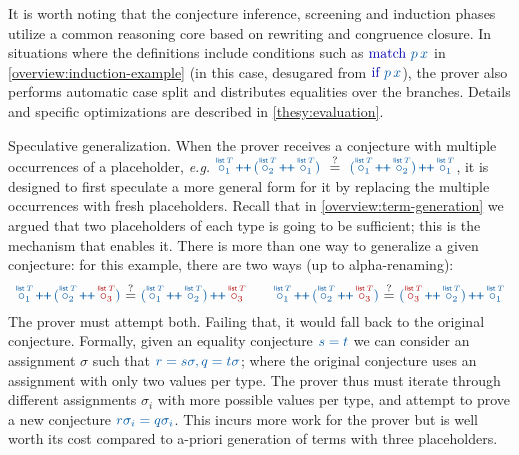 It is worth noting that the conjecture inference, screening and induction phases
utilize a common reasoning core based on rewriting and congruence closure.
In situations where the definitions include conditions such as
$\clrterm\tmatch~p\,x$ in \autoref{overview:induction-example} (in this case, desugared from $\clrterm\tif~p\,x$), the prover also performs automatic case split
and distributes equalities over the branches.
Details and specific optimizations are described in \autoref{thesy:evaluation}.

\begin{paragraph}{Speculative generalization.}
When the prover receives a conjecture with multiple occurrences of a placeholder, \textit{e.g.}
${\clrterm {\pholder{1}{\tlist\,T}} \concat 
   {(\pholder{2}{\tlist\,T} \concat \pholder{1}{\tlist\,T})}}
~\maybeEq~
 {\clrterm {({{\pholder{1}{\tlist\,T}} \concat 
   {\pholder{2}{\tlist\,T}})} \concat \pholder{1}{\tlist\,T}}}$,
it is designed to first speculate a more general form for it by replacing the multiple occurrences with fresh placeholders.
Recall that in \autoref{overview:term-generation} we argued that two placeholders of each type is going to be sufficient;
this is the mechanism that enables it.
There is more than one way to generalize a given conjecture: for this example, there are two ways (up to alpha-renaming):
\[
{\clrterm {\pholder{1}{\tlist\,T}} \concat 
   {(\pholder{2}{\tlist\,T} \concat {\clrhi\pholder{3}{\tlist\,T}})}}
\maybeEq
 {\clrterm {({{\pholder{1}{\tlist\,T}} \concat 
   {\pholder{2}{\tlist\,T}})} \concat {\clrhi\pholder{3}{\tlist\,T}}}}
\hspace{2em}
{\clrterm {\pholder{1}{\tlist\,T}} \concat 
   {(\pholder{2}{\tlist\,T} \concat {\clrhi\pholder{3}{\tlist\,T}})}}
\maybeEq
 {\clrterm {({{\clrhi\pholder{3}{\tlist\,T}} \concat 
   {\pholder{2}{\tlist\,T}})} \concat \pholder{1}{\tlist\,T}}}
\]
The prover must attempt both. Failing that, it would fall back to the original conjecture.
Formally, given an equality conjecture $\clrterm{s = t}$ we can consider an assignment $\sigma$ such that $\clrterm{ r = s\sigma, q = t\sigma}$;
where the original conjecture uses an assignment with only two values per type.
The prover thus must iterate through different assignments $\sigma_i$ with more possible values per type, and attempt to prove a new conjecture $\clrterm{r\sigma_i = q\sigma_i}$.
This incurs more work for the prover but is well worth its cost compared to a-priori generation of terms with three placeholders. 
\end{paragraph}

